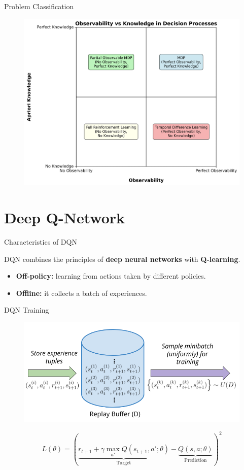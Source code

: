 \documentclass[serif]{beamer}  %
\begin{document}
    \begin{frame}{Problem Classification}
        \begin{figure}
            \centering
            \includegraphics[width=0.8\linewidth]{images/knowledge_vs_observability.png}
        \end{figure}
    \end{frame}

\section{Deep Q-Network}

\begin{frame}{Characteristics of DQN}

    DQN combines the principles of \textbf{deep neural networks} with \textbf{Q-learning}.
    \vspace{1cm}
    \begin{itemize}
        \item \textbf{Off-policy:} learning from actions taken by different policies.
        \vspace{0.5cm}
        \item \textbf{Offline:} it collects a batch of experiences.
    \end{itemize}
\end{frame}

\begin{frame}{DQN Training}
    \begin{figure}
        \centering
        \includegraphics[width=0.8\linewidth]{images/experience_replay_buffer.png}
    \end{figure}
    \[L(\theta) = \left( \underbrace{r_{t+1} + \gamma \max_{a'} Q(s_{t+1}, a'; \theta)}_{\text{Target}} - \underbrace{Q(s, a; \theta)}_{\text{Prediction}} \right)^2\]
\end{frame}
\end{document}
